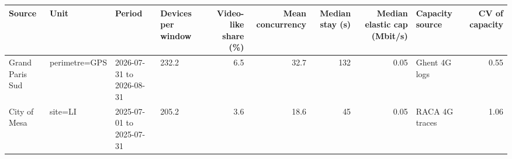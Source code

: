 \begin{tabular}{llllrrrrlr}
\toprule
Source & Unit & Period & Devices per window & Video-like share (\%) & Mean concurrency & Median stay (s) & Median elastic cap (Mbit/s) & Capacity source & CV of capacity \\
\midrule
Grand Paris Sud & perimetre=GPS & 2026-07-31 to 2026-08-31 & 232.2 & 6.5 & 32.7 & 132 & 0.05 & Ghent 4G logs & 0.55 \\
City of Mesa & site=LI & 2025-07-01 to 2025-07-31 & 205.2 & 3.6 & 18.6 & 45 & 0.05 & RACA 4G traces & 1.06 \\
\bottomrule
\end{tabular}
